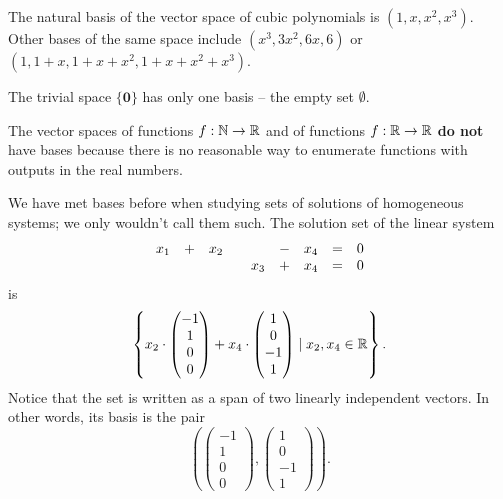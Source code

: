 \begin{example}{}{}
 The natural basis of the vector space of cubic polynomials is $(1,x,x^2,x^3)$.
 Other bases of the same space include $(x^3,3x^2,6x,6)$ or
 $(1,1+x,1+x+x^2,1+x+x^2+x^3)$.
\end{example}

\begin{example}{}{}
 The trivial space $\{\mathbf{0}\}$ has only one basis -- the empty set
 $\emptyset$.
\end{example}

\begin{example}{}{}
 The vector spaces of functions $f:\mathbb{N} \to \mathbb{R}$ and of functions $f:\mathbb{R} \to \mathbb{R}$
 \textbf{do not} have bases because there is no reasonable way to enumerate
 functions with outputs in the real numbers.
\end{example}

\begin{example}{}{}
 We have met bases before when studying sets of solutions of homogeneous
 systems; we only wouldn't call them such. The solution set of the linear system
 \[
  \begin{array}{r c r c r c r c l}
   x_1 & + & x_2 & & & - & x_4 & = & 0\\
       & & & & x_3 & + & x_4 & = &0
  \end{array}
 \]
 is
 \[
  \left\{
   x_2 \cdot 
   \begin{pmatrix}
    -1\\
    1\\
    0\\
    0
   \end{pmatrix}
   + x_4 \cdot 
   \begin{pmatrix}
    1\\
    0\\
    -1\\
    1
   \end{pmatrix}
   \mid x_2,x_4 \in \mathbb{R}
  \right\}.
 \]
 Notice that the set is written as a span of two linearly independent vectors.
 In other words, its basis is the pair
 \[
  \left( 
   \begin{pmatrix}
    -1\\
    1\\
    0\\
    0
   \end{pmatrix},
   \begin{pmatrix}
    1\\
    0\\
    -1\\
    1
   \end{pmatrix}
  \right).
 \]
\end{example}

